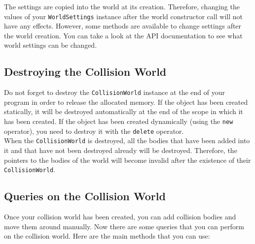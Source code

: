 \documentclass[a4paper,12pt]{article}
\begin{document}
    \vspace{0.6cm}

    The settings are copied into the world at its creation. Therefore, changing the values of your \texttt{WorldSettings} instance after the world constructor call
    will not have any effects. However, some methods are available to change settings after the world creation. You can take a look at the API documentation to see what
    world settings can be changed.

    \subsection{Destroying the Collision World}

    Do not forget to destroy the \texttt{CollisionWorld} instance at the end of your program in order to release the allocated memory. If the object has been created
    statically, it will be destroyed automatically at the end of the scope in which it has been created. If the object has been created dynamically (using the \texttt{new}
    operator), you need to destroy it with the \texttt{delete} operator. \\

    When the \texttt{CollisionWorld} is destroyed, all the bodies that have been added into it and that have not been destroyed already will be destroyed.
    Therefore, the pointers to the bodies of the world will become invalid after the existence of their \texttt{CollisionWorld}.

    \subsection{Queries on the Collision World}

    Once your collision world has been created, you can add collision bodies and move them around manually. Now there are some queries that you can perform on the
    collision world. Here are the main methods that you can use:  
\end{document}
